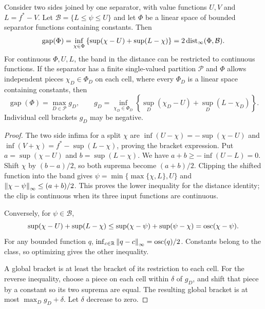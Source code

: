 \begin{theorem}
\label{thm:consistency-band}
Consider two sides joined by one separator, with value functions $U,V$
and $L=f^*-V$.  Let $\mathcal B=\{L\le\psi\le U\}$ and let $\Phi$ be a
linear space of bounded separator functions containing constants.  Then
\begin{equation}
\label{eq:consistency-band-distance}
 \operatorname{gap}(\Phi)
 =\inf_{\chi\in\Phi}\left\{\sup(\chi-U)+\sup(L-\chi)\right\}
 =2\operatorname{dist}_\infty(\Phi,\mathcal B).
\end{equation}
For continuous $\Phi,U,L$, the band in the distance can be restricted to
continuous functions.
If the separator has a finite single-valued partition $\mathcal P$ and
$\Phi$ allows independent pieces $\chi_D\in\Phi_D$ on each cell, where
every $\Phi_D$ is a linear space containing constants, then
\begin{equation}
\label{eq:consistency-worst-cell}
 \operatorname{gap}(\Phi)=\max_{D\in\mathcal P}g_D,\qquad
 g_D=\inf_{\chi_D\in\Phi_D}
 \left\{\sup_D(\chi_D-U)+\sup_D(L-\chi_D)\right\}.
\end{equation}
Individual cell brackets $g_D$ may be negative.
\end{theorem}

\begin{proof}
The two side infima for a split $\chi$ are
$\inf(U-\chi)=-\sup(\chi-U)$ and
$\inf(V+\chi)=f^*-\sup(L-\chi)$, proving the bracket expression.
Put $a=\sup(\chi-U)$ and $b=\sup(L-\chi)$.
We have $a+b\ge-\inf(U-L)=0$.
Shift $\chi$ by $(b-a)/2$, so both suprema become $(a+b)/2$.
Clipping the shifted function into the band gives
$\psi=\min\{\max\{\chi,L\},U\}$ and
$\left\lVert \chi-\psi\right\rVert_\infty\le(a+b)/2$.
This proves the lower inequality for the distance identity; the clip is
continuous when its three input functions are continuous.

Conversely, for $\psi\in\mathcal B$,
\[
 \sup(\chi-U)+\sup(L-\chi)
 \le\sup(\chi-\psi)+\sup(\psi-\chi)=\operatorname{osc}(\chi-\psi).
\]
For any bounded function $q$,
$\inf_{c\in\mathbb R}\left\lVert q-c\right\rVert_\infty=\operatorname{osc}(q)/2$.
Constants belong to the class, so optimizing gives the other inequality.

A global bracket is at least the bracket of its restriction to each
cell.  For the reverse inequality, choose a piece on each cell within
$\delta$ of $g_D$, and shift that piece by a constant so its two
suprema are equal.  The resulting global bracket is at most
$\max_Dg_D+\delta$.  Let $\delta$ decrease to zero.
\end{proof}

